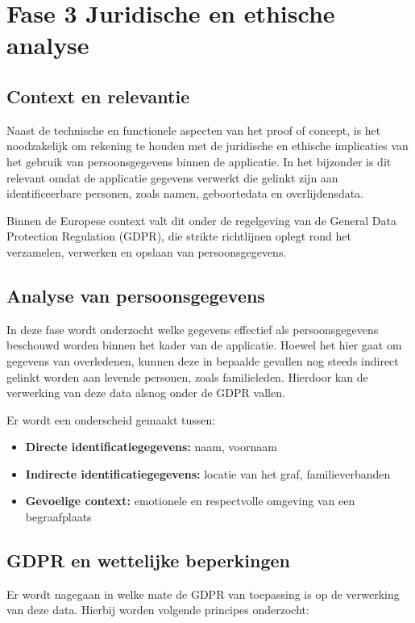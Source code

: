 \section{Fase 3 Juridische en ethische analyse}

\subsection{Context en relevantie}

Naast de technische en functionele aspecten van het proof of concept, is het noodzakelijk om rekening te houden met de juridische en ethische implicaties van het gebruik van persoonsgegevens binnen de applicatie. In het bijzonder is dit relevant omdat de applicatie gegevens verwerkt die gelinkt zijn aan identificeerbare personen, zoals namen, geboortedata en overlijdensdata.

Binnen de Europese context valt dit onder de regelgeving van de General Data Protection Regulation (GDPR), die strikte richtlijnen oplegt rond het verzamelen, verwerken en opslaan van persoonsgegevens.

\subsection{Analyse van persoonsgegevens}

In deze fase wordt onderzocht welke gegevens effectief als persoonsgegevens beschouwd worden binnen het kader van de applicatie. Hoewel het hier gaat om gegevens van overledenen, kunnen deze in bepaalde gevallen nog steeds indirect gelinkt worden aan levende personen, zoals familieleden. Hierdoor kan de verwerking van deze data alsnog onder de GDPR vallen.

Er wordt een onderscheid gemaakt tussen:
\begin{itemize}
    \item \textbf{Directe identificatiegegevens:} naam, voornaam
    \item \textbf{Indirecte identificatiegegevens:} locatie van het graf, familieverbanden
    \item \textbf{Gevoelige context:} emotionele en respectvolle omgeving van een begraafplaats
\end{itemize}

\subsection{GDPR en wettelijke beperkingen}

Er wordt nagegaan in welke mate de GDPR van toepassing is op de verwerking van deze data. Hierbij worden volgende principes onderzocht:

